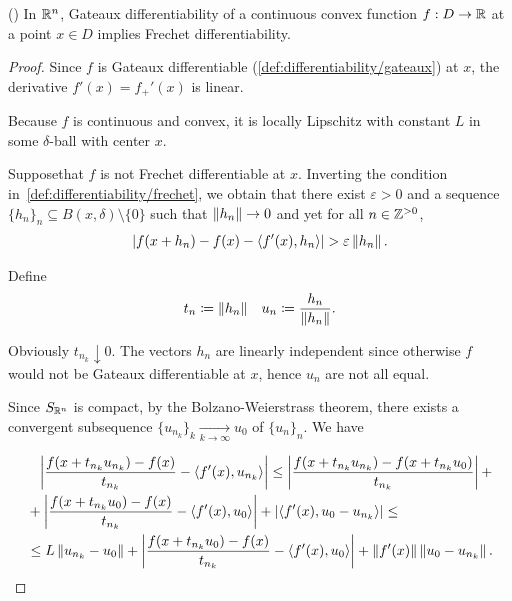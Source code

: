 \begin{theorem}\label{thm:rn_continuous_convex_gateaux_implies_frechet}(\cite[exercise 1.15(a)]{Phelps1993})
  In $\mathbb R^n$, Gateaux differentiability of a continuous convex function $f: D \to \mathbb R$ at a point $x \in D$ implies Frechet differentiability.
\end{theorem}
\begin{proof}
  Since $f$ is Gateaux differentiable (\cref{def:differentiability/gateaux}) at $x$, the derivative $f'(x) = f_+'(x)$ is linear.

  Because $f$ is continuous and convex, it is locally Lipschitz with constant $L$ in some $\delta$-ball with center $x$.

  Suppose\LEM that $f$ is not Frechet differentiable at $x$. Inverting the condition in~\cref{def:differentiability/frechet}, we obtain that there exist $\varepsilon > 0$ and a sequence $\{ h_n \}_n \subseteq B(x, \delta) \setminus \{ 0 \}$ such that $\left\Vert h_n \right\Vert \to 0$ and yet for all $n \in \mathbb Z^{>0}$,
  \begin{align}\label{thm:rn_continuous_convex_gateaux_implies_frechet/frechet_assumption}
    \left\vert f(x + h_n) - f(x) - \left\langle f'(x), h_n \right\rangle \right\vert > \varepsilon \left\Vert h_n \right\Vert.
  \end{align}

  Define
  \begin{align*}
    t_n \coloneqq \left\Vert h_n \right\Vert
    &&
    u_n \coloneqq \frac{h_n} {\left\Vert h_n \right\Vert}.
  \end{align*}

  Obviously $t_{n_k} \downarrow 0$. The vectors $h_n$ are linearly independent since otherwise $f$ would not be Gateaux differentiable at $x$, hence $u_n$ are not all equal.

  Since $S_{\mathbb R^n}$ is compact\USC, by the Bolzano-Weierstrass theorem, there exists a convergent subsequence $\{ u_{n_k} \}_k \underset {k \to \infty} \to u_0$ of $\{ u_n \}_n$. We have

  \begin{align}\label{thm:rn_continuous_convex_gateaux_implies_frechet/frechet_estimate}
    &\phantom= \Abs{\frac {f(x + t_{n_k} u_{n_k}) - f(x)} {t_{n_k}} - \Prod{f'(x)} {u_{n_k}}}
    \leq \nonumber
    \Abs{\frac {f(x + t_{n_k} u_{n_k}) - f(x + t_{n_k} u_0)} {t_{n_k}}} + \\ &+ \Abs{\frac {f(x + t_{n_k} u_0) - f(x)} {t_{n_k}} - \Prod{f'(x)} {u_0}} + \Abs{\Prod{f'(x)} {u_0 - u_{n_k}}}
    \leq \nonumber \\ &\leq
    L \Norm{u_{n_k} - u_0} + \Abs{\frac {f(x + t_{n_k} u_0) - f(x)} {t_{n_k}} - \Prod{f'(x)} {u_0}} + \Norm{f'(x)} \Norm{u_0 - u_{n_k}}.
  \end{align}


\end{proof}
